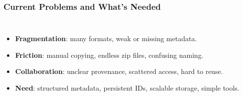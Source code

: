 \documentclass{beamer}
\begin{document}
	\begin{frame}
		\frametitle{Current Problems and What’s Needed}
		\begin{columns}[T,totalwidth=\textwidth]
			\begin{itemize}
				\item \textbf{Fragmentation}: many formats, weak or missing metadata.
				\item \textbf{Friction}: manual copying, endless zip files, confusing naming.
				\item \textbf{Collaboration}: unclear provenance, scattered access, hard to reuse.
				\item \textbf{Need}: structured metadata, persistent IDs, scalable storage, simple tools.
			\end{itemize}
		\end{columns}
	\end{frame}
	
\end{document}
